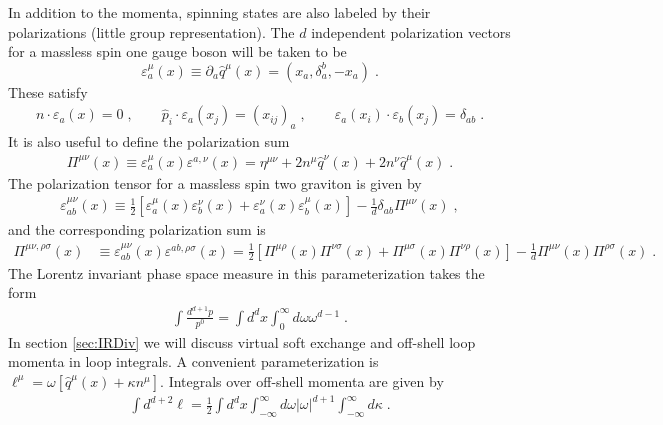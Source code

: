 \documentclass[11pt]{article}
\def\d{{\delta}}
\def\o{{\omega}}
\def\ve{{\varepsilon}}
\def\p{{\partial}}
\def\s{{\sigma}}
\begin{document}
In addition to the momenta, spinning states are also labeled by their polarizations (little group representation). The $d$ independent polarization vectors for a massless spin one gauge boson will be taken to be
\begin{equation}\label{gluonpol}
\ve_a^\mu(x) \equiv \p_a \hat{q}^\mu(x) =  ( x_a , \delta_a^b, - x_a  ) \; . 
\end{equation}
These satisfy
\begin{equation}
\begin{split}
n \cdot \ve_a(x) = 0 \; , \qquad {\hat p}_i \cdot \ve_a(x_j) = ( x_{ij} )_a \; , \qquad \ve_a(x_i) \cdot \ve_b(x_j) = \d_{ab}  \; . 
\end{split}
\end{equation}
It is also useful to define the polarization sum
\begin{equation}
\begin{split}\label{polsum}
\Pi^{\mu\nu}(x) \equiv \ve^\mu_a(x) \ve^{a,\nu} (x) = \eta^{\mu\nu} + 2 n^{\mu} {\hat q}^{\nu}(x) + 2 n^{\nu} {\hat q}^{\mu}(x) \; . 
\end{split}
\end{equation}
The polarization tensor for a massless spin two graviton is given by
\begin{equation}
\begin{split}\label{gravpol}
\ve^{\mu\nu}_{ab}(x) \equiv\frac{1}{2}  [ \ve_a^{\mu}(x) \ve^{\nu}_b(x) + \ve_a^\nu(x) \ve^\mu_b(x)  ] - \frac{1}{d} \d_{ab} \Pi^{\mu\nu}(x)  \;, 
\end{split}
\end{equation}
and the corresponding polarization sum is 
\begin{equation}
\begin{split}\label{polsumgrav}
\Pi^{\mu\nu,\rho\s}(x) &\equiv  \ve^{\mu\nu}_{ab}(x) \ve^{ab,\rho\s}(x) = \frac{1}{2}\left[ \Pi^{\mu\rho} (x) \Pi^{\nu\s} (x) + \Pi^{\mu\s} (x) \Pi^{\nu \rho}(x) \right] - \frac{1}{d}\Pi^{\mu\nu} (x) \Pi^{\rho\s}(x) \; . 
\end{split}
\end{equation}
The Lorentz invariant phase space measure in this parameterization takes the form
\begin{equation}
\begin{split}
\int \frac{d^{d+1}p}{p^0} = \int  d^d x \int_0^\infty d\o \o^{d-1}  \;. 
\end{split}
\end{equation}
In section \ref{sec:IRDiv} we will discuss virtual soft exchange and off-shell loop momenta in loop integrals. A convenient parameterization is $\ell^\mu = \o [ {\hat q}^\mu (x) + \kappa n^\mu ]$. Integrals over off-shell momenta are given by
\begin{equation}
\begin{split}\label{momintegraloffshell}
\int d^{d+2} \ell = \frac{1}{2}  \int  d^d x  \int_{-\infty}^\infty d\o |\o|^{d+1}  \int_{-\infty}^\infty d\kappa \;. 
\end{split}
\end{equation}
\end{document}
